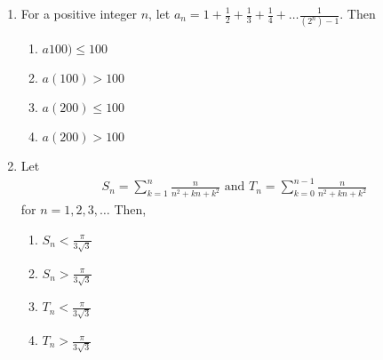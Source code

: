 \begin{enumerate}[label=\thesubsection.\arabic*,ref=\thesubsection.\theenumi]
		    \hfill{(2015)}
\begin{multicols}{4}
\begin{enumerate}    
    \item $ 52^{nd} $
    \item $ 58^{th} $
    \item $ 46^{th} $
    \item $ 59^{th} $
    \end{enumerate}
\end{multicols} 
\item For a positive integer $n$,  let
$a_n=1+\frac{1}{2}+\frac{1}{3}+\frac{1}{4}+\dots\frac{1}{(2^n)-1}$. Then \hfill{}
\begin{multicols}{4}
\begin{enumerate}    
\item $a100)\leq 100$
\item $a(100) > 100$
\item $a(200)\leq 100$
\item $a(200) > 100$
\end{enumerate}
\end{multicols}
%
%
\item Let 
\begin{align*}
S_n=\sum_{k=1}^{n}\frac{n}{n^2+kn+k^2} \text{ and }   T_n=\sum_{k=0}^{n-1}\frac{n}{n^2+kn+k^2}
\end{align*}
for $n=1, 2, 3, \dots$ Then, \hfill{}
\begin{multicols}{4}
\begin{enumerate}    
\item $S_n<\frac{\pi}{3\sqrt{3}}$
\item $S_n>\frac{\pi}{3\sqrt{3}}$
\item $T_n<\frac{\pi}{3\sqrt{3}}$
\item $T_n>\frac{\pi}{3\sqrt{3}}$
\end{enumerate}
\end{multicols}
%
\end{enumerate}
